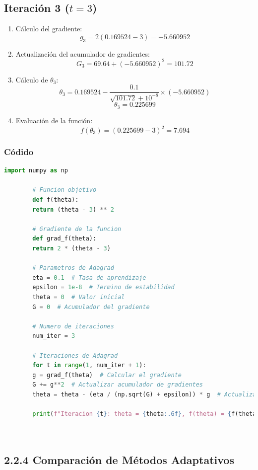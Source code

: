 \documentclass[a5paper]{article}
\begin{document}
	\subsection*{Iteración 3 (\( t = 3 \))}
	
	\begin{enumerate}
		\item Cálculo del gradiente:
		\[
		g_3 = 2(0.169524 - 3) = -5.660952
		\]
		\item Actualización del acumulador de gradientes:
		\[
		G_3 = 69.64 + (-5.660952)^2 = 101.72
		\]
		\item Cálculo de \( \theta_3 \):
		\[
		\theta_3 = 0.169524 - \frac{0.1}{\sqrt{101.72} + 10^{-8}} \times (-5.660952)
		\]
		\[
		\theta_3 = 0.225699
		\]
		\item Evaluación de la función:
		\[
		f(\theta_3) = (0.225699 - 3)^2 = 7.694
		\]
	\end{enumerate}
	
	
	\subsubsection*{Códido}
	\begin{lstlisting}[language=Python, caption=Adaptive Gradient Algorithm, frame=single]
		import numpy as np
		
		# Funcion objetivo
		def f(theta):
		return (theta - 3) ** 2
		
		# Gradiente de la funcion
		def grad_f(theta):
		return 2 * (theta - 3)
		
		# Parametros de Adagrad
		eta = 0.1  # Tasa de aprendizaje
		epsilon = 1e-8  # Termino de estabilidad
		theta = 0  # Valor inicial
		G = 0  # Acumulador del gradiente
		
		# Numero de iteraciones
		num_iter = 3
		
		# Iteraciones de Adagrad
		for t in range(1, num_iter + 1):
		g = grad_f(theta)  # Calcular el gradiente
		G += g**2  # Actualizar acumulador de gradientes
		theta = theta - (eta / (np.sqrt(G) + epsilon)) * g  # Actualizar theta
		
		print(f"Iteracion {t}: theta = {theta:.6f}, f(theta) = {f(theta):.6f}, G = {G:.6f}")
		
		
	\end{lstlisting}
	
	\subsection*{2.2.4 Comparación de Métodos Adaptativos}
	
\end{document}
